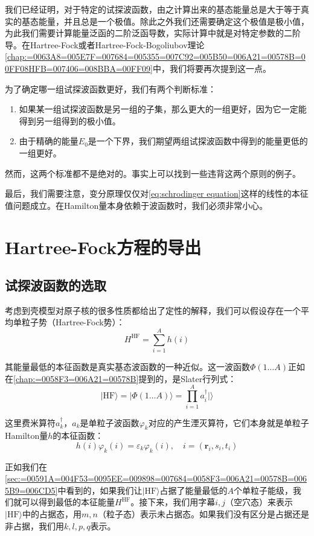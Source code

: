 我们已经证明，对于特定的试探波函数，由之计算出来的基态能量总是大于等于真实的基态能量，并且总是一个极值。除此之外我们还需要确定这个极值是极小值，为此我们需要计算能量泛函的二阶泛函导数，实际计算中就是对特定参数的二阶导。在Hartree-Fock或者Hartree-Fock-Bogoliubov理论\ref{chap:=0063A8=005E7F=007684=005355=007C92=005B50=006A21=00578B=00FF08HFB=007406=008BBA=00FF09}中，我们将要再次提到这一点。

为了确定哪一组试探波函数更好，我们有两个判断标准：
\begin{enumerate}
\item 如果某一组试探波函数是另一组的子集，那么更大的一组更好，因为它一定能得到另一组得到的极小值。
\item 由于精确的能量$E_{0}$是一个下界，我们期望两组试探波函数中得到的能量更低的一组更好。
\end{enumerate}
然而，这两个标准都不是绝对的。事实上可以找到一些违背这两个原则的例子。

最后，我们需要注意，变分原理仅仅对\ref{eq:schrodinger equation}这样的线性的本征值问题成立。在Hamilton量本身依赖于波函数时，我们必须非常小心。

\section{Hartree-Fock方程的导出\label{sec:Hartree-Fock=0065B9=007A0B=007684=005BFC=0051FA}}

\subsection{试探波函数的选取\label{subsec:=008BD5=0063A2=006CE2=0051FD=006570=007684=009009=0053D6}}

考虑到壳模型对原子核的很多性质都给出了定性的解释，我们可以假设存在一个平均单粒子势（Hartree-Fock势）：
\[
H^{\text{HF}}=\sum^{A}_{i=1}h(i)
\]

其能量最低的本征函数是真实基态波函数的一种近似。这一波函数$\Phi(1\dots A)$正如在\ref{chap:=0058F3=006A21=00578B}提到的，是Slater行列式：
\[
|\text{HF}\rangle=|\Phi(1\dots A)\rangle=\prod^{A}_{i=1}a^{\dagger}_{i}|\rangle
\]

这里费米算符$a^{\dagger}_{k}$，$a_{k}$是单粒子波函数$\varphi_{k}$对应的产生湮灭算符，它们本身就是单粒子Hamilton量$h$的本征函数：
\[
h(i)\varphi_{k}(i)=\varepsilon_{k}\varphi_{k}(i),\quad i=(\boldsymbol{r}_{i},s_{i},t_{i})
\]

正如我们在\ref{sec:=00591A=004F53=0095EE=009898=007684=0058F3=006A21=00578B=0065B9=006CD5}中看到的，如果我们让$|\text{HF}\rangle$占据了能量最低的$A$个单粒子能级，我们就可以得到最低的本征能量$H^{\text{HF}}$。接下来，我们用字幕$i,j$（空穴态）来表示$|\text{HF}\rangle$中的占据态，用$m,n$（粒子态）表示未占据态。如果我们没有区分是占据还是非占据，我们用$k,l,p,q$表示。

